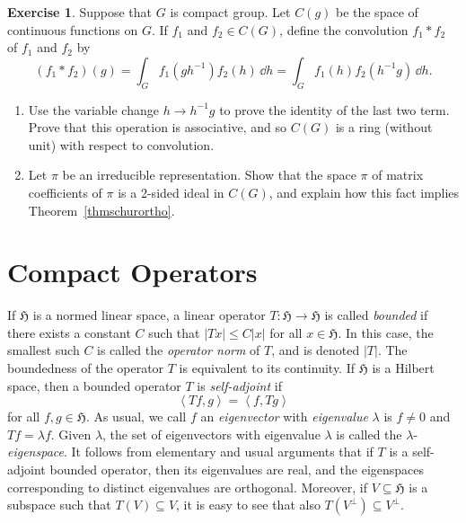 \documentclass[12pt,reqno]{book}%
\theoremstyle{definition}
\newtheorem{exercise}{Exercise}[chapter]
\theoremstyle{remark}
\theoremstyle{theorem}
\theoremstyle{remark}
\renewcommand{\d}{\dd}
\begin{document}
\begin{exercise}\label{}
    Suppose that $G$ is compact group.
    Let $C(g)$ be the space of continuous functions on $G$.
    If $f_1$ and $f_2 \in C(G)$, define the convolution $f_1 * f_2$ of $f_1$ and $f_2$ by
    \[
        (f_1 * f_2)(g) = \int_{G} f_1(gh^{-1}) f_2(h) \, \d h = \int_{G} f_1(h) f_2(h^{-1}g) \, \d h.
    \]
    \begin{enumerate}[label= (\roman*),font=\normalfont,before=\normalfont]
        \item Use the variable change $h \to h^{-1}g$ to prove the identity of the last two term.
            Prove that this operation is associative, and so $C(G)$ is a ring (without unit) with respect to convolution.
        \item Let $\pi$ be an irreducible representation.
            Show that the space $\mathcal{\pi}$ of matrix coefficients of $\pi$ is a 2-sided ideal in $C(G)$, and explain how this fact implies Theorem~\ref{thmschurortho}.
    \end{enumerate}
\end{exercise}


\chapter{Compact Operators}\label{}%
If $\mathfrak{H}$ is a normed linear space, a linear operator $T : \mathfrak{H} \to \mathfrak{H}$ is called \emph{bounded} if there exists a constant $C$ such that $|Tx| \leq C|x|$ for all $x \in \mathfrak{H}$.
In this case, the smallest such $C$ is called the \emph{operator norm} of $T$, and is denoted $|T|$.
The boundedness of the operator $T$ is equivalent to its continuity.
If $\mathfrak{H}$ is a Hilbert space, then a bounded operator $T$ is \emph{self-adjoint} if
\[
    {\left\langle Tf, g\right\rangle} = {\left\langle f, Tg\right\rangle}
\]
for all $f, g \in \mathfrak{H}$.
As usual, we call $f$ an \emph{eigenvector} with \emph{eigenvalue} $\lambda$ is $f \neq 0$ and $Tf = \lambda f$.
Given $\lambda$, the set of eigenvectors with eigenvalue $\lambda$ is called the $\lambda$-\emph{eigenspace}.
It follows from elementary and usual arguments that if $T$ is a self-adjoint bounded operator, then its eigenvalues are real, and the eigenspaces corresponding to distinct eigenvalues are orthogonal.
Moreover, if $V \subseteq \mathfrak{H}$ is a subspace such that $T(V) \subseteq V$, it is easy to see that also $T(V^\perp) \subseteq V^\perp$.
\end{document}
